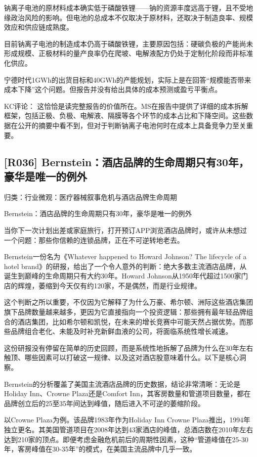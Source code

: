 \documentclass[11pt]{ctexart}
\begin{document}
钠离子电池的原材料成本确实低于磷酸铁锂——钠的资源丰度远高于锂，且不受地缘政治风险的影响。但电池的总成本不仅取决于原材料，还取决于制造良率、规模效应和供应链成熟度。

目前钠离子电池的制造成本仍高于磷酸铁锂，主要原因包括：硬碳负极的产能尚未形成规模、正极材料的量产良率仍在爬坡、电解液配方仍处于定制化阶段而非标准化供应。

宁德时代1GWh的出货目标和40GWh的产能规划，实际上是在回答“规模能否带来成本下降”这个问题。但报告并没有给出具体的成本预测或盈亏平衡点。

KC评论： 这恰恰是读完整报告的价值所在。MS在报告中提供了详细的成本拆解框架，包括正极、负极、电解液、隔膜等各个环节的成本占比和下降空间。这些数据在公开的摘要中看不到，但对于判断钠离子电池何时在成本上具备竞争力至关重要。

\subsection{[R036] Bernstein：酒店品牌的生命周期只有30年，豪华是唯一的例外}
{\small\color{refgray}归类：行业微观：医疗器械叙事危机与酒店品牌生命周期}

Bernstein：酒店品牌的生命周期只有30年，豪华是唯一的例外

当你下一次计划出差或家庭旅行，打开预订APP浏览酒店品牌时，或许从未想过一个问题：那些你信赖的连锁品牌，正在不可逆转地老去。

Bernstein一份名为《Whatever happened to Howard Johnson? The lifecycle of a hotel brand》的研报，给出了一个令人意外的判断：绝大多数主流酒店品牌，从诞生到巅峰的生命周期只有大约30年。Howard Johnson从1950年代超过1500家门店的辉煌，萎缩到今天仅有约120家，不是偶然，而是行业规律。

这个判断之所以重要，不仅因为它解释了为什么万豪、希尔顿、洲际这些酒店集团旗下品牌数量越来越多，更因为它直接指向一个投资逻辑：那些拥有最年轻品牌组合的酒店集团，比如希尔顿和凯悦，在未来的增长竞赛中可能天然占据优势。而那些品牌组合老化、未能及时补充新鲜血液的公司，将面临系统性增长减速。

这份研报没有停留在简单的历史回顾，而是系统性地拆解了品牌为什么在30年左右触顶、哪些因素可以打破这一规律、以及这对酒店股意味着什么。以下是核心洞察。

Bernstein的分析覆盖了美国主流酒店品牌的历史数据，结论非常清晰：无论是Holiday Inn、Crowne Plaza还是Comfort Inn，其客房数量和管道项目数量，都在品牌创立后的25至35年间达到峰值，随后进入不可逆的萎缩阶段。

以Crowne Plaza为例。该品牌1983年作为Holiday Inn Crowne Plaza推出，1994年独立更名。其美国管道项目在2008年达到43家酒店的峰值，总酒店数在2010年左右达到210家的顶点。即便考虑金融危机前后的周期性因素，这种“管道峰值在25-30年，客房峰值在30-35年”的模式，在美国主流品牌中几乎一致。
\end{document}
